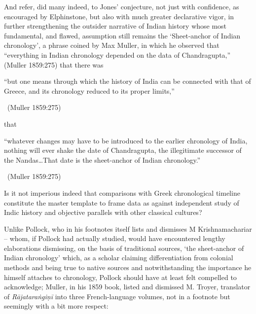 And refer, did many indeed, to Jones’ conjecture, not just with confidence, as encouraged by Elphinstone, but also with much greater declarative vigor, in further strengthening the outsider narrative of Indian history whose most fundamental, and flawed, assumption still remains the ‘Sheet-anchor of Indian chronology’, a phrase coined by Max Muller, in which he observed that “everything in Indian chronology depended on the data of Chandragupta,” (Muller 1859:275) that there was

\begin{myquote}
“but one means through which the history of India can be connected with that of Greece, and its chronology reduced to its proper limits,” 

~\hfill (Muller 1859:275)
\end{myquote}

that


\begin{myquote}
“whatever changes may have to be introduced to the earlier chronology of India, nothing will ever shake the date of Chandragupta, the illegitimate successor of the Nandas…That date is the sheet-anchor of Indian chronology.” 

~\hfill (Muller 1859:275)
\end{myquote}

Is it not imperious indeed that comparisons with Greek chronological timeline constitute the master template to frame data as against independent study of Indic history and objective parallels with other classical cultures?

Unlike Pollock, who in his footnotes itself lists and dismisses M Krishnamachariar – whom, if Pollock had actually studied, would have encountered lengthy elaborations dismissing, on the basis of traditional sources, ‘the sheet-anchor of Indian chronology’ which, as a scholar claiming differentiation from colonial methods and being true to native sources and notwithstanding the importance he himself attaches to chronology, Pollock should have at least felt compelled to acknowledge; Muller, in his 1859 book, listed and dismissed M. Troyer, translator of \textit{Rājataraṅgiṇī} into three French-language volumes, not in a footnote but seemingly with a bit more respect:

